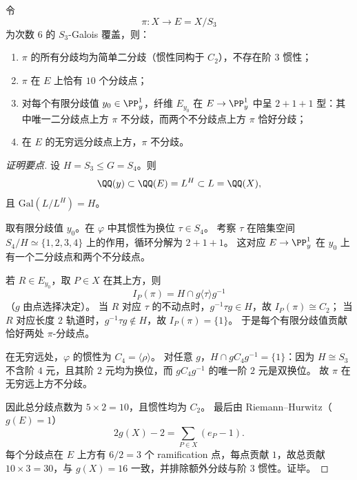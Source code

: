 \begin{conclusion}\label{con:xi-terminal-zm-s3-subcover-branch-divisor-complete}
令
\[
\pi:X\longrightarrow E=X/S_3
\]
为次数 \(6\) 的 \(S_3\)-Galois 覆盖，则：
\begin{enumerate}
  \item \(\pi\) 的所有分歧均为简单二分歧（惯性同构于 \(C_2\)），不存在阶 \(3\) 惯性；
  \item \(\pi\) 在 \(E\) 上恰有 \(10\) 个分歧点；
  \item 对每个有限分歧值 \(y_0\in\PP^1_y\)，纤维 \(E_{y_0}\) 在 \(E\to\PP^1_y\) 中呈 \(2+1+1\) 型：其中唯一二分歧点上方 \(\pi\) 不分歧，而两个不分歧点上方 \(\pi\) 恰好分歧；
  \item 在 \(E\) 的无穷远分歧点上方，\(\pi\) 不分歧。
\end{enumerate}
\end{conclusion}
\begin{proof}[证明要点]
设 \(H=S_3\le G=S_4\)。则
\[
\QQ(y)\subset \QQ(E)=L^H\subset L=\QQ(X),
\]
且 \(\mathrm{Gal}(L/L^H)=H\)。

取有限分歧值 \(y_0\)。在 \(\varphi\) 中其惯性为换位 \(\tau\in S_4\)。
考察 \(\tau\) 在陪集空间 \(S_4/H\simeq\{1,2,3,4\}\) 上的作用，循环分解为 \(2+1+1\)。
这对应 \(E\to\PP^1_y\) 在 \(y_0\) 上有一个二分歧点和两个不分歧点。

若 \(R\in E_{y_0}\)，取 \(P\in X\) 在其上方，则
\[
I_P(\pi)=H\cap g\langle\tau\rangle g^{-1}
\]
（\(g\) 由点选择决定）。
当 \(R\) 对应 \(\tau\) 的不动点时，\(g^{-1}\tau g\in H\)，故 \(I_P(\pi)\cong C_2\)；
当 \(R\) 对应长度 \(2\) 轨道时，\(g^{-1}\tau g\notin H\)，故 \(I_P(\pi)=\{1\}\)。
于是每个有限分歧值贡献恰好两处 \(\pi\)-分歧点。

在无穷远处，\(\varphi\) 的惯性为 \(C_4=\langle\rho\rangle\)。
对任意 \(g\)，\(H\cap gC_4g^{-1}=\{1\}\)：因为 \(H\cong S_3\) 不含阶 \(4\) 元，且其阶 \(2\) 元均为换位，而 \(gC_4g^{-1}\) 的唯一阶 \(2\) 元是双换位。
故 \(\pi\) 在无穷远上方不分歧。

因此总分歧点数为 \(5\times2=10\)，且惯性均为 \(C_2\)。
最后由 Riemann--Hurwitz（\(g(E)=1\)）
\[
2g(X)-2=\sum_{P\in X}(e_P-1).
\]
每个分歧点在 \(E\) 上方有 \(6/2=3\) 个 ramification 点，每点贡献 \(1\)，故总贡献 \(10\times3=30\)，与 \(g(X)=16\) 一致，并排除额外分歧与阶 \(3\) 惯性。证毕。
\end{proof}

